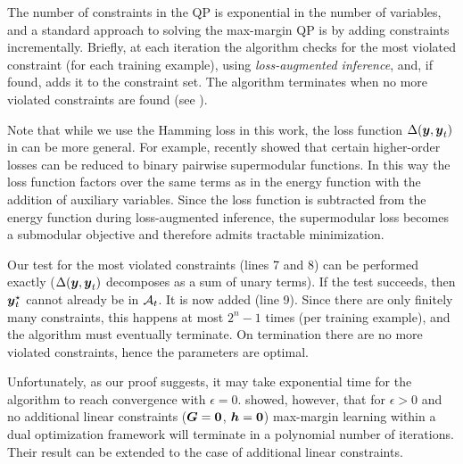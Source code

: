 The number of constraints in the QP is exponential in the number of
variables, and a standard approach to solving the max-margin QP is by
adding constraints incrementally. Briefly, at each iteration the
algorithm checks for the most violated constraint (for each training
example), using \emph{loss-augmented inference}, and, if found, adds
it to the constraint set. The algorithm terminates when no more
violated constraints are found (see ).

Note that while we use the Hamming loss in this work, the loss
function $\Delta({\boldsymbol{y}}, {\boldsymbol{y}}_t)$ in  can be more
general. For example, \citet{Pletscher:AISTATS12} recently showed that
certain higher-order losses can be reduced to binary pairwise
supermodular functions. In this way the loss function factors over the
same terms as in the energy function with the addition of auxiliary
variables. Since the loss function is subtracted from the energy
function during loss-augmented inference, the supermodular loss
becomes a submodular objective and therefore admits tractable
minimization.

Our test for the most violated constraints (lines 7 and 8) can be
performed exactly ($\Delta({\boldsymbol{y}}, {\boldsymbol{y}}_t)$ decomposes as a sum of
unary terms). If the test succeeds, then ${\boldsymbol{y}}_t^\star$ cannot
already be in $\A_t$. It is now added (line 9). Since there are
only finitely many constraints, this happens at most $2^n - 1$
times (per training example), and the algorithm must eventually
terminate. On termination there are no more violated constraints,
hence the parameters are optimal.

Unfortunately, as our proof suggests, it may take exponential
time for the algorithm to reach convergence with $\epsilon = 0$.
 showed, however, that for
$\epsilon > 0$ and no additional linear constraints (\ie ${\boldsymbol{G}} =
\textbf{0}$, ${\boldsymbol{h}} = \textbf{0}$) max-margin learning within a dual
optimization framework will terminate in a polynomial number of
iterations. Their result can be extended to the case of
additional linear constraints.





